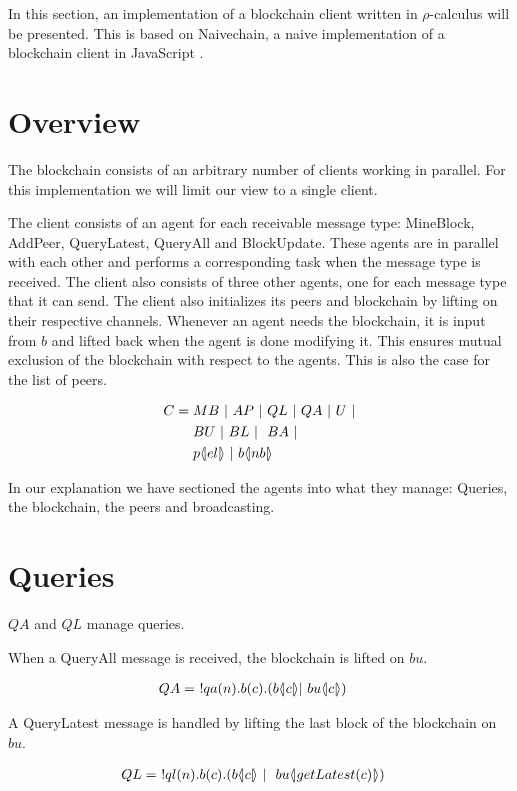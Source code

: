 In this section, an implementation of a blockchain client written in $\rho$-calculus will be presented.
This is based on Naivechain, a naive implementation of a blockchain client in JavaScript \cite{naivechain}.

\section{Overview}
The blockchain consists of an arbitrary number of clients working in parallel. For this implementation we will limit our view to a single client.

The client consists of an agent for each receivable message type: MineBlock, AddPeer, QueryLatest, QueryAll and BlockUpdate.
These agents are in parallel with each other and performs a corresponding task when the message type is received.
The client also consists of three other agents, one for each message type that it can send.
The client also initializes its peers and blockchain by lifting on their respective channels.
Whenever an agent needs the blockchain, it is input from $b$ and lifted back when the agent is done modifying it.
This ensures mutual exclusion of the blockchain with respect to the agents.
This is also the case for the list of peers.

\begin{align*}
    C &= MB\ |\ AP\ |\ QL\ |\ QA\ |\ U\ |\\
    &\quad \ BU\ |\ BL\ |\ \ BA\ |\\
    &\quad \ p \langle \! | el | \! \rangle\ |\ b \langle \! | nb | \! \rangle
\end{align*}

In our explanation we have sectioned the agents into what they manage: Queries, the blockchain, the peers and broadcasting.

\section{Queries}

$QA$ and $QL$ manage queries.

When a QueryAll message is received, the blockchain is lifted on $bu$.

\begin{align*}
    QA &=\ !qa(n).b(c).(b \langle \! | c | \! \rangle| \ bu \langle \! | c | \! \rangle)
\end{align*}

A QueryLatest message is handled by lifting the last block of the blockchain on $bu$.

\begin{align*}
	QL &=\ !ql(n).b(c).(b  \langle \! | c | \! \rangle\ |\ \ bu \langle \! | getLatest(c) | \! \rangle)
\end{align*}

